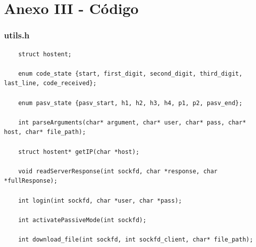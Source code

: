 \documentclass[article, a4paper, 11pt, oneside]{memoir}
\begin{document}
\newpage
\section{Anexo III - Código}
\subsubsection{utils.h}
\begin{lstlisting}
	struct hostent;

	enum code_state {start, first_digit, second_digit, third_digit, last_line, code_received};
	
	enum pasv_state {pasv_start, h1, h2, h3, h4, p1, p2, pasv_end};
	
	int parseArguments(char* argument, char* user, char* pass, char* host, char* file_path);
	
	struct hostent* getIP(char *host);
	
	void readServerResponse(int sockfd, char *response, char *fullResponse);
	
	int login(int sockfd, char *user, char *pass);
	
	int activatePassiveMode(int sockfd);
	
	int download_file(int sockfd, int sockfd_client, char* file_path);
\end{lstlisting}
\end{document}
